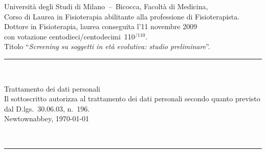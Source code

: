 \documentclass{article}
\newcommand{\titolo}[1]{\bgroup\rule{\linewidth}{1pt}\\[-14pt]
\null\hfill\fontsize{10pt}{12pt}\sc\selectfont\strut#1\\[21pt]\egroup}
\begin{document}
%
{Universit\`a degli Studi di Milano~--~Bicocca, Facolt\`a di Medicina,\\ Corso di Laurea in Fisioterapia abilitante alla professione di Fisioterapista.}%
{Dottore in Fisioterapia, laurea conseguita l'11 novembre 2009\\ con votazione centodieci/centodecimi~110$^{/110}$.\\ Titolo ``\textit{Screening su soggetti in et\`a evolutiva: studio preliminare}''.}

\vfill
\titolo{Trattamento dei dati personali}
\vspace{-14pt}
Il sottoscritto autorizza al trattamento dei dati personali secondo quanto previsto dal D.lgs.~30.06.03, n.~196.\\[28pt]

\null\hfill Newtownabbey, \today\\[-7pt]
\null\hfill\begin{minipage}{0.5\linewidth}\centering
\resizebox{0.8\linewidth}{!}{}\\[-16pt]
\rule{\linewidth}{0.5pt}
\end{minipage}
\end{document}
